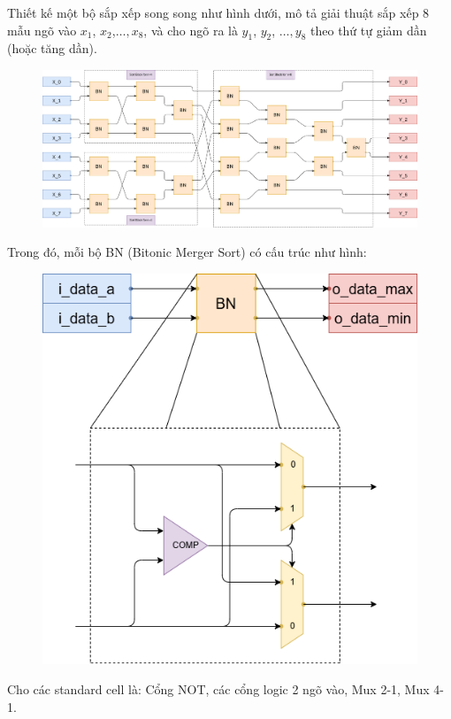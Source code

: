 
Thiết kế một bộ sắp xếp song song như hình dưới, mô tả giải thuật sắp xếp 8 mẫu ngõ vào $x_{1}$, $x_{2}$,$\dots, x_{8}$, và cho ngõ ra là $y_{1}$, $y_{2}$, $\dots, y_{8}$ theo thứ tự giảm dần (hoặc tăng dần).

\begin{figure}[H]
	\centering
	\includegraphics[width=\linewidth]{./my-chapters/my-diagrams/Question6/debai.png}
\end{figure}

Trong đó, mỗi bộ BN (Bitonic Merger Sort) có cấu trúc như hình:

\begin{figure}[H]
	\centering
	\includegraphics[width=.4\linewidth]{./my-chapters/my-diagrams/Question6/Swap_and_compare.png}
\end{figure}

Cho các standard cell là: Cổng NOT, các cổng logic 2 ngõ vào, Mux 2-1, Mux 4-1.


